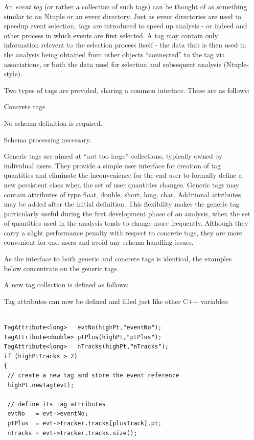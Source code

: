 \par
An \emph{event tag} (or rather a collection of such tags)
can be thought of as something similar to an Ntuple or an event directory.
Just as event directories are used to speedup event selection, tags
are introduced to speed up analysis - or indeed and other process
in which events are first selected. A tag may contain only information
relevent to the selection process itself - the data that is then used in the
analysis being obtained from other objects ``connected'' to the tag
via associations, or both the data used for selection and subsequent analysis (Ntuple-style).

\par
Two types of tags are provided, sharing a common interface. These are
as follows:\begin{DLtt}{Concrete tags}
\item[Generic tags]No schema definition is required.
\item[Concrete tags]Schema processing necessary.
\end{DLtt}

\par
Generic tags are aimed at ``not too large'' collections, typically owned by individual users. 
They provide a simple user interface for creation of tag quantities and eliminate the 
inconvenience for the end user to formally define a new persistent class when the set of user quantities changes. 
Generic tags may contain attributes of type float, double, short, long, char. 
Additional attributes may be added after the initial definition. 
This flexibility makes the generic tag particularly useful during the first development 
phase of an analysis, when the set of quantities used in the analysis tends to change more frequently. 
Although they carry a slight performance penalty with respect to concrete tags, 
they are more convenient for end users and avoid any schema handling issues.

\par
As the interface to both generic and concrete tags is identical, the examples
below concentrate on the generic tags.
\par

A new tag collection is defined as follows:
\par
{}
\par
Tag attributes can now be defined and filled just like other C++ variables: 
\begin{verbatim}

TagAttribute<long>   evtNo(highPt,"eventNo"); 
TagAttribute<double> ptPlus(highPt,"ptPlus"); 
TagAttribute<long>   nTracks(highPt,"nTracks"); 
if (highPtTracks > 2) 
{ 
 // create a new tag and store the event reference 
 highPt.newTag(evt); 

 // define its tag attributes 
 evtNo   = evt->eventNo; 
 ptPlus  = evt->tracker.tracks[plusTrack].pt; 
 nTracks = evt->tracker.tracks.size();

\end{verbatim}

